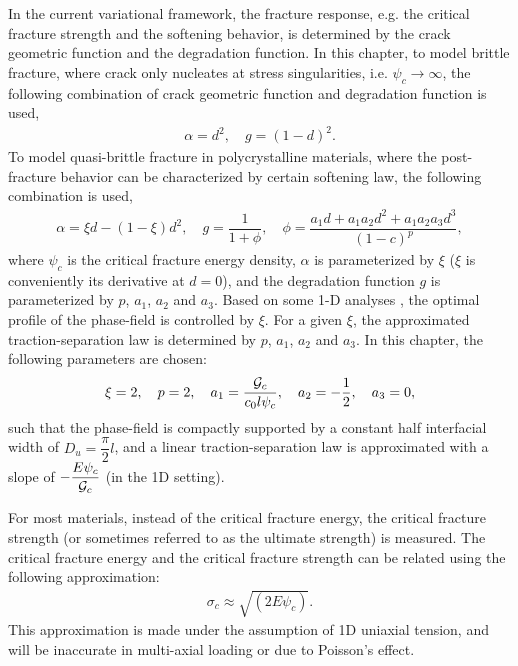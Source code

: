In the current variational framework, the fracture response, e.g. the critical fracture strength and the softening behavior, is determined by the crack geometric function and the degradation function. In this chapter, to model brittle fracture, where crack only nucleates at stress singularities, i.e. $\psi_c \to \infty$, the following combination of crack geometric function and degradation function is used,
\begin{align}
  \alpha = d^2, \quad g = (1-d)^2.
\end{align}
To model quasi-brittle fracture in polycrystalline materials, where the post-fracture behavior can be characterized by certain softening law, the following combination is used,
\begin{align}
  \alpha = \xi d- (1-\xi) d^2, \quad g = \dfrac{1}{1+\phi}, \quad \phi = \dfrac{a_1d + a_1a_2d^2 + a_1a_2a_3d^3}{(1-c)^p},
\end{align}
where $\psi_c$ is the critical fracture energy density, $\alpha$ is parameterized by $\xi$ ($\xi$ is conveniently its derivative at $d = 0$), and the degradation function $g$ is parameterized by $p$, $a_1$, $a_2$ and $a_3$. Based on some 1-D analyses \cite{wu2017unified}, the optimal profile of the phase-field is controlled by $\xi$. For a given $\xi$, the approximated traction-separation law is determined by $p$, $a_1$, $a_2$ and $a_3$. In this chapter, the following parameters are chosen:
\begin{align}
  \xi = 2, \quad p = 2, \quad a_1 = \dfrac{{\mathcal{G}_c}}{c_0 l \psi_c}, \quad a_2 = -\dfrac{1}{2}, \quad a_3 = 0,
\end{align}
such that the phase-field is compactly supported by a constant half interfacial width of $D_u = \dfrac{\pi}{2}l$, and a linear traction-separation law is approximated with a slope of $-\dfrac{E\psi_c}{{\mathcal{G}_c}}$ (in the 1D setting).

\begin{remark}
  For most materials, instead of the critical fracture energy, the critical fracture strength (or sometimes referred to as the ultimate strength) is measured. The critical fracture energy and the critical fracture strength can be related using the following approximation:
  \begin{align}
    \sigma_c \approx \sqrt{(2E\psi_c)}.
  \end{align}
  This approximation is made under the assumption of 1D uniaxial tension, and will be inaccurate in multi-axial loading or due to Poisson's effect.
\end{remark}

